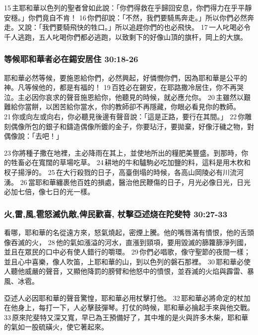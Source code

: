 15 主耶和華以色列的聖者曾如此說：「你們得救在乎歸回安息，你們得力在乎平靜安穩。」你們竟自不肯！ 16 你們卻說：「不然，我們要騎馬奔走。」所以你們必然奔走。又說：「我們要騎飛快的牲口。」所以追趕你們的也必飛快。 17 一人叱喝必令千人逃跑，五人叱喝你們都必逃跑，以致剩下的好像山頂的旗杆，岡上的大旗。

\subsubsection{等候耶和華者必在錫安居住 30:18-26}
耶和華必然等候，要施恩給你們，必然興起，好憐憫你們，因為耶和華是公平的神。凡等候他的，都是有福的！ 19 百姓必在錫安，在耶路撒冷居住，你不再哭泣。主必因你哀求的聲音施恩給你，他聽見的時候，就必應允你。 20 主雖然以艱難給你當餅，以困苦給你當水，你的教師卻不再隱藏，你眼必看見你的教師。 21 你或向左或向右，你必聽見後邊有聲音說：「這是正路，要行在其間。」 22 你雕刻偶像所包的銀子和鑄造偶像所鍍的金子，你要玷汙，要拋棄，好像汙穢之物，對偶像說：「去吧！」

23 你將種子撒在地裡，主必降雨在其上，並使地所出的糧肥美豐盛。到那時，你的牲畜必在寬闊的草場吃草。 24 耕地的牛和驢駒必吃加鹽的料，這料是用木杴和杈子揚淨的。 25 在大行殺戮的日子，高臺倒塌的時候，各高山岡陵必有川流河湧。 26 當耶和華纏裹他百姓的損處，醫治他民鞭傷的日子，月光必像日光，日光必加七倍，像七日的光一樣。

\subsubsection{火,雷,風,雹怒滅仇敵,俾民歡喜, 杖擊亞述烧在陀斐特 30:27-33}
看哪，耶和華的名從遠方來，怒氣燒起，密煙上騰。他的嘴唇滿有憤恨，他的舌頭像吞滅的火， 28 他的氣如漲溢的河水，直漲到頸項，要用毀滅的篩籮篩淨列國，並且在眾民的口中必有使人錯行的嚼環。 29 你們必唱歌，像守聖節的夜間一樣；並且心中喜樂，像人吹笛，上耶和華的山，到以色列的磐石那裡。 30 耶和華必使人聽他威嚴的聲音，又顯他降罰的膀臂和他怒中的憤恨，並吞滅的火焰與霹雷、暴風、冰雹。

亞述人必因耶和華的聲音驚惶，耶和華必用杖擊打他。 32 耶和華必將命定的杖加在他身上，每打一下，人必擊鼓彈琴。打仗的時候，耶和華必掄起手來與他交戰。 33 原來陀斐特又深又寬，早已為王預備好了，其中堆的是火與許多木柴，耶和華的氣如一股硫磺火，使它著起來。


